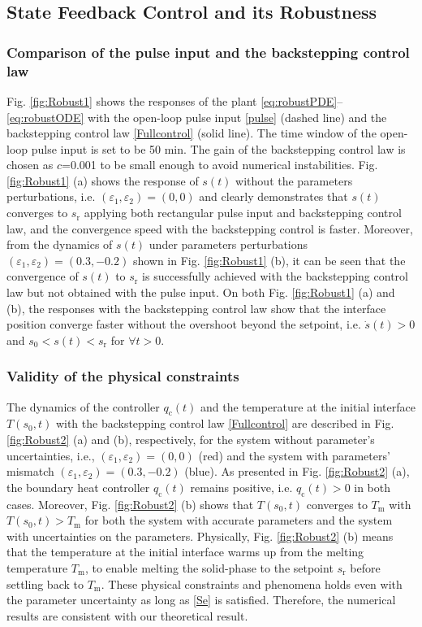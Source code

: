 \documentclass[journal]{IEEEtran}
\begin{document}
\subsection{State Feedback Control and its Robustness}
\subsubsection{Comparison of the pulse input and the backstepping control law}
Fig. \ref{fig:Robust1} shows the responses of the plant \eqref{eq:robustPDE}--\eqref{eq:robustODE} with the  open-loop pulse input \eqref{pulse} (dashed line) and the backstepping control law \eqref{Fullcontrol} (solid line). The time window of the open-loop pulse input is set to be 50 min. The gain of the backstepping control law is chosen as $c$=0.001 to be small enough to avoid numerical instabilities. Fig. \ref{fig:Robust1} (a) shows the response of $s(t)$ without the parameters perturbations, i.e. $(\varepsilon_1, \varepsilon_2)=(0,0)$ and clearly demonstrates that $s(t)$ converges to $s_{{\mathrm r}}$ applying both rectangular  pulse input and backstepping control law, and the convergence speed with the backstepping control is faster. Moreover, from the dynamics of $s(t)$ under parameters perturbations $(\varepsilon_1, \varepsilon_2)=(0.3,-0.2)$ shown in Fig. \ref{fig:Robust1} (b), it can be seen that the convergence of $s(t)$ to $s_{{\mathrm r}}$ is successfully achieved  with the backstepping control law but  not obtained  with the pulse input. On both Fig. \ref{fig:Robust1} (a) and (b), the responses with the backstepping control law show that the interface position  converge faster without the overshoot beyond the setpoint, i.e. $\dot{s}(t)>0$ and $s_0<s(t)<s_{{\mathrm r}}$ for $\forall t>0$. 

\subsubsection{Validity of the physical constraints}
The dynamics  of the controller $q_{{\mathrm c}}(t)$ and the temperature at the initial interface $T(s_0,t)$ with the backstepping control law \eqref{Fullcontrol} are described in Fig. \ref{fig:Robust2} (a) and (b), respectively,  for the system without  parameter's uncertainties, i.e., $(\varepsilon_1, \varepsilon_2)=(0,0)$ (red) and the system with parameters' mismatch  $(\varepsilon_1, \varepsilon_2)=(0.3,-0.2)$ (blue). As presented in Fig. \ref{fig:Robust2} (a), the boundary heat controller $q_{{\mathrm c}}(t)$ remains positive, i.e. $q_{{\mathrm c}}(t)>0$ in both cases. Moreover,  Fig. \ref{fig:Robust2} (b) shows that $T(s_0,t)$ converges to $T_{{\mathrm m}}$ with $T(s_0,t)>T_{{\mathrm m}}$ for both the system with accurate parameters and the system with uncertainties on the parameters. Physically,   Fig. \ref{fig:Robust2} (b) means that the temperature at the initial interface warms up from the melting temperature $T_{{\mathrm m}}$, to enable  melting  the solid-phase to the setpoint $s_{{\mathrm r}}$ before settling back  to $T_{{\mathrm m}}$. These physical constraints and phenomena holds even with the parameter uncertainty as long as  \eqref{Se} is satisfied. Therefore, the numerical results are consistent with our theoretical result. 
\end{document}
